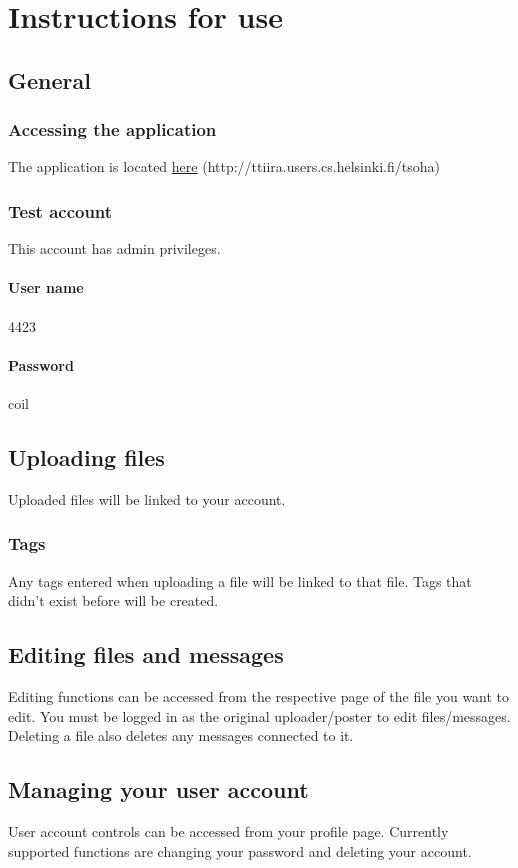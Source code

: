 \documentclass[10pt,a4paper]{article}
\begin{document}
\section{Instructions for use}
\subsection{General}
\subsubsection{Accessing the application}
The application is located \href{http://ttiira.users.cs.helsinki.fi/tsoha}{here} (http://ttiira.users.cs.helsinki.fi/tsoha)
\subsubsection{Test account}
This account has admin privileges.
\paragraph{User name} 4423
\paragraph{Password} coil

\subsection{Uploading files}
Uploaded files will be linked to your account. 
\subsubsection{Tags}
Any tags entered when uploading a file will be linked to that file. Tags that didn't exist before will be created.

\subsection{Editing files and messages}
Editing functions can be accessed from the respective page of the file you want to edit. You must be logged in as the original uploader/poster to edit files/messages. Deleting a file also deletes any messages connected to it.

\subsection{Managing your user account}
User account controls can be accessed from your profile page. Currently supported functions are changing your password and deleting your account.
\end{document}

